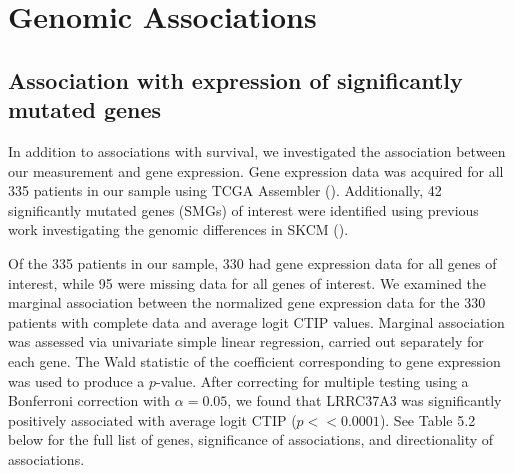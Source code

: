 \documentclass[
]{book}
\begin{document}
\hypertarget{genomic-associations}{%
\chapter{Genomic Associations}\label{genomic-associations}}

\hypertarget{association-with-expression-of-significantly-mutated-genes}{%
\section{Association with expression of significantly mutated genes}\label{association-with-expression-of-significantly-mutated-genes}}

In addition to associations with survival, we investigated the
association between our measurement and gene expression. Gene
expression data was acquired for all 335 patients in
our sample using TCGA Assembler (\citet{Zhu14}). Additionally,
42 significantly mutated genes (SMGs) of interest were identified
using previous work investigating the genomic differences in
SKCM (\citet{Akbani15}).

Of the 335 patients in our sample, 330 had gene expression data
for all genes of interest, while 95 were missing data for all
genes of interest. We examined the marginal association between
the normalized gene expression data for the 330 patients with
complete data and average logit CTIP values. Marginal association
was assessed via univariate simple linear regression, carried out
separately for each gene. The Wald statistic of the coefficient
corresponding to gene expression was used to produce a \(p\)-value.
After correcting for multiple testing using a Bonferroni correction with \(\alpha = 0.05\), we found that LRRC37A3 was significantly positively associated with
average logit CTIP (\(p << 0.0001\)). See Table 5.2 below for the full list of genes, significance of associations, and directionality of associations.
\end{document}
